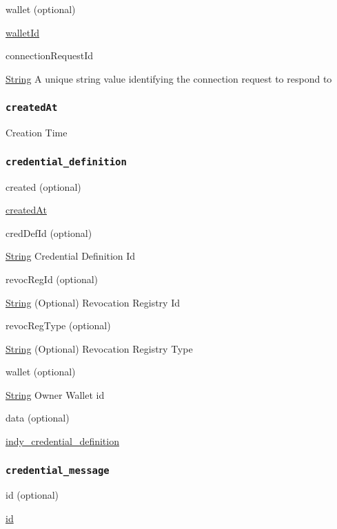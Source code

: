 wallet (optional)

{\protect\hyperlink{walletId}{walletId}}

connectionRequestId

{\protect\hyperlink{string}{String}} A unique string value identifying
the connection request to respond to

\hypertarget{createdat}{%
\subsubsection{\texorpdfstring{\protect\hypertarget{createdAt}{}{\texttt{createdAt}}}{createdAt}}\label{createdat}}

Creation Time

\hypertarget{credential_definition}{%
\subsubsection{\texorpdfstring{\protect\hypertarget{credential_definition}{}{\texttt{credential\_definition}}}{credential\_definition}}\label{credential_definition}}

created (optional)

{\protect\hyperlink{createdAt}{createdAt}}

credDefId (optional)

{\protect\hyperlink{string}{String}} Credential Definition Id

revocRegId (optional)

{\protect\hyperlink{string}{String}} (Optional) Revocation Registry Id

revocRegType (optional)

{\protect\hyperlink{string}{String}} (Optional) Revocation Registry Type

wallet (optional)

{\protect\hyperlink{string}{String}} Owner Wallet id

data (optional)

{\protect\hyperlink{indy_credential_definition}{indy\_credential\_definition}}

\hypertarget{credential_message}{%
\subsubsection{\texorpdfstring{\protect\hypertarget{credential_message}{}{\texttt{credential\_message}}}{credential\_message}}\label{credential_message}}

id (optional)

{\protect\hyperlink{id}{id}}

